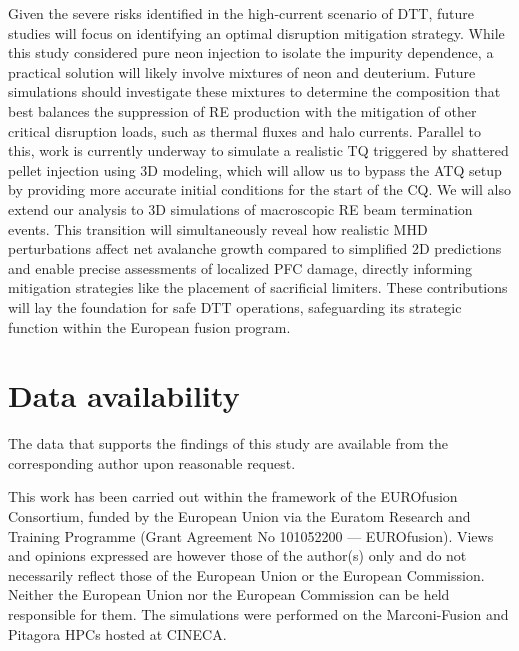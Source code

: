 \documentclass[aip,reprint]{revtex4-1}
\begin{document}
Given the severe risks identified in the high-current scenario of DTT, future studies will focus on identifying an optimal disruption mitigation strategy. While this study considered pure neon injection to isolate the impurity dependence, a practical solution will likely involve mixtures of neon and deuterium. Future simulations should investigate these mixtures to determine the composition that best balances the suppression of RE production with the mitigation of other critical disruption loads, such as thermal fluxes and halo currents. Parallel to this, work is currently underway to simulate a realistic TQ triggered by shattered pellet injection using 3D modeling, which will allow us to bypass the ATQ setup by providing more accurate initial conditions for the start of the CQ. We will also extend our analysis to 3D simulations of macroscopic RE beam termination events. This transition will simultaneously reveal how realistic MHD perturbations affect net avalanche growth compared to simplified 2D predictions and enable precise assessments of localized PFC damage, directly informing mitigation strategies like the placement of sacrificial limiters. These contributions will lay the foundation for safe DTT operations, safeguarding its strategic function within the European fusion program.



\section*{Data availability}
The data that supports the findings of this study
are available from the corresponding author upon
reasonable request.


\begin{acknowledgments}
This work has been carried out within the framework of the EUROfusion Consortium, funded by the European Union via the Euratom Research and Training Programme (Grant Agreement No 101052200 — EUROfusion). Views and opinions expressed are however those of the author(s) only and do not necessarily reflect those of the European Union or the European Commission. Neither the European Union nor the European Commission can be held responsible for them.
The simulations were performed on the Marconi-Fusion and Pitagora HPCs hosted at CINECA.
\end{acknowledgments}




\end{document}
